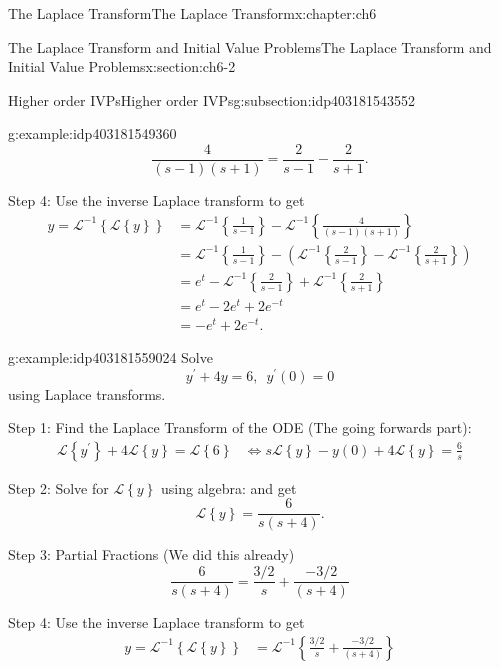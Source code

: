 \documentclass[oneside,10pt,]{book}
\numberwithin{equation}{section}
\numberwithin{equation}{section}
\newcommand{\amp}{&}
\begin{document}
\begin{chapterptx}{The Laplace Transform}{}{The Laplace Transform}{}{}{x:chapter:ch6}
\begin{sectionptx}{The Laplace Transform and Initial Value Problems}{}{The Laplace Transform and Initial Value Problems}{}{}{x:section:ch6-2}
\begin{subsectionptx}{Higher order IVPs}{}{Higher order IVPs}{}{}{g:subsection:idp403181543552}
\begin{example}{}{g:example:idp403181549360}
\begin{equation*}
\frac{4}{\left(s-1\right)\left(s+1\right)}=\frac{2}{s-1}-\frac{2}{s+1}.
\end{equation*}
%
\par
Step 4: Use the inverse Laplace transform to get%
\begin{align*}
y=\mathcal{L}^{-1}\left\{ \mathcal{L}\left\{ y\right\} \right\}  \amp =\mathcal{L}^{-1}\left\{ \frac{1}{s-1}\right\} -\mathcal{L}^{-1}\left\{ \frac{4}{\left(s-1\right)\left(s+1\right)}\right\} \\
\amp =\mathcal{L}^{-1}\left\{ \frac{1}{s-1}\right\} -\left(\mathcal{L}^{-1}\left\{ \frac{2}{s-1}\right\} -\mathcal{L}^{-1}\left\{ \frac{2}{s+1}\right\} \right)\\
\amp =e^{t}-\mathcal{L}^{-1}\left\{ \frac{2}{s-1}\right\} +\mathcal{L}^{-1}\left\{ \frac{2}{s+1}\right\} \\
\amp =e^{t}-2e^{t}+2e^{-t}\\
\amp =-e^{t}+2e^{-t}.
\end{align*}
%
\end{example}
\begin{example}{}{g:example:idp403181559024}%
Solve%
\begin{equation*}
y^{\prime}+4y=6,\,\,\,y^{\prime}(0)=0
\end{equation*}
using Laplace transforms.%
\par
Step 1: Find the Laplace Transform of the ODE (The going forwards part):%
\begin{align*}
\mathcal{L}\left\{ y^{\prime}\right\} +4\mathcal{L}\left\{ y\right\} =\mathcal{L}\left\{ 6\right\}  \amp \iff s\mathcal{L}\left\{ y\right\} -y(0)+4\mathcal{L}\left\{ y\right\} =\frac{6}{s}
\end{align*}
%
\par
Step 2: Solve for \(\mathcal{L}\left\{ y\right\} \) using algebra: and get%
\begin{equation*}
\mathcal{L}\left\{ y\right\} =\frac{6}{s\left(s+4\right)}.
\end{equation*}
%
\par
Step 3: Partial Fractions (We did this already)%
\begin{equation*}
\frac{6}{s\left(s+4\right)}=\frac{3/2}{s}+\frac{-3/2}{\left(s+4\right)}
\end{equation*}
%
\par
Step 4: Use the inverse Laplace transform to get%
\begin{align*}
y=\mathcal{L}^{-1}\left\{ \mathcal{L}\left\{ y\right\} \right\}  \amp =\mathcal{L}^{-1}\left\{ \frac{3/2}{s}+\frac{-3/2}{\left(s+4\right)}\right\} \\

\end{align*}
\end{example}
\end{subsectionptx}
\end{sectionptx}
\end{chapterptx}
\end{document}
